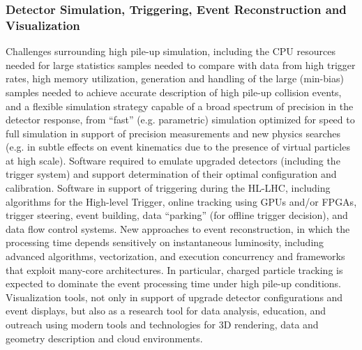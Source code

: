 \begin{frame}
\frametitle{Detector Simulation, Triggering, Event Reconstruction and Visualization} 
\scriptsize{
Challenges surrounding high pile-up simulation,
including the CPU resources needed for large statistics samples
needed to compare with data from high trigger rates, high memory
utilization, generation and handling of the large (min-bias) samples
needed to achieve accurate description of high pile-up collision
events, and a flexible simulation strategy capable of a broad
spectrum of precision in the detector response, from ``fast''
(e.g. parametric) simulation optimized for speed to full simulation
in support of precision measurements and new physics searches
(e.g. in subtle effects on event kinematics due to the presence of
virtual particles at high scale).
Software required to emulate upgraded detectors (including the
trigger system) and support determination of their optimal
configuration and calibration.
Software in support of triggering
during the HL-LHC, including algorithms for the High-level Trigger,
online tracking using GPUs and/or FPGAs, trigger steering, event
building, data ``parking'' (for offline trigger decision), and data
flow control systems. New approaches to event reconstruction, in
which the processing time depends sensitively on instantaneous
luminosity, including advanced algorithms, vectorization, and
execution concurrency and frameworks that exploit many-core
architectures. In particular, charged particle tracking is expected
to dominate the event processing time under high pile-up
conditions. Visualization tools, not only in support of upgrade
detector configurations and event displays, but also as a research
tool for data analysis, education, and outreach using modern tools
and technologies for 3D rendering, data and geometry description and
cloud environments.
}
\end{frame}


